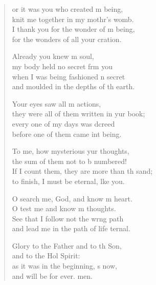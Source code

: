 \begin{verse}
  \begin{patverse}
or it was you who created m being,\Med\\
knit me together in my mothr’s womb.\\
I thank you for the wonder of m being,\Med\\
for the wonders of all your cration.

Already you knew m soul,\Med\\
my body held no secret frm you\\
when I was being fashioned \pointup{\i}n secret\Med\\
and moulded in the depths of th earth.

Your eyes saw all m actions,\Med\\
they were all of them written in yur book;\\
every one of my days was dcreed\Med\\
before one of them came int being.

To me, how mysterious yur thoughts,\Med\\
the sum of them not to b numbered!\\
If I count them, they are more than th sand;\Med\\
to finish, I must be eternal, l\pointup{\i}ke you.

O search me, God, and know m heart.\Med\\
O test me and know m thoughts.\\
See that I follow not the wrng path\Med\\
and lead me in the path of life ternal.

Glory to the Father and to th Son,\Med\\
and to the Hol Spirit:\\
as it was in the beginning, \pointup{\i}s now,\Med\\
and will be for ever. men.
  \end{patverse}
\end{verse}
